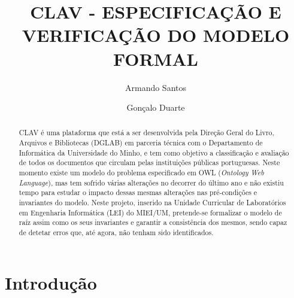 \documentclass[tikz,runningheads,a4paper]{llncs}
\begin{document}
%
\title{CLAV - ESPECIFICAÇÃO E VERIFICAÇÃO DO MODELO FORMAL}
%
%
\author{Armando Santos \and
Gonçalo Duarte}

%
%
%
\maketitle              %
%
\begin{abstract}

CLAV é uma plataforma que está a ser desenvolvida pela Direção Geral do Livro, Arquivos e Bibliotecas (DGLAB) em parceria técnica com o Departamento de Informática da Universidade do Minho, e tem como objetivo a classificação e avaliação de todos os documentos que circulam pelas instituições públicas portuguesas. Neste momento existe um modelo do problema especificado em OWL (\textit{Ontology Web Language}), mas tem sofrido várias alterações no decorrer do último ano e não existiu tempo para estudar o impacto dessas mesmas alterações nas pré-condições e invariantes do modelo. Neste projeto, inserido na Unidade Curricular de Laboratórios em Engenharia Informática (LEI) do MIEI/UM, pretende-se formalizar o modelo de raíz assim como os seus invariantes e garantir a consistência dos mesmos, sendo capaz de detetar erros que, até agora, não tenham sido identificados.

\end{abstract}
%
%
%
\section{Introdução}
\end{document}
